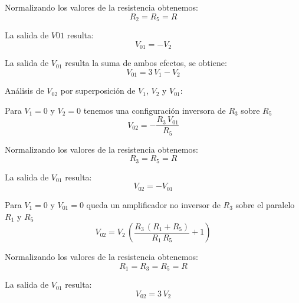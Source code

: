 \documentclass[12pt]{article}
\begin{document}
		Normalizando los valores de la resistencia obtenemos:
		\begin{equation}
			R_2=R_5=R 
		\end{equation}
		
		La salida de $V01$ resulta:
		\begin{equation}
			V_{01}=-V_2
		\end{equation}
		
		La salida de $V_{01}$ resulta la suma de ambos efectos, se obtiene:
		\begin{equation}
			V_{01}=3\,V_1-V_2
		\end{equation}
		
		Análisis de $V_{02}$ por superposición de $V_1$, $V_2$ y $V_{01}$:
		
		Para $V_1=0$ y $V_2=0$  tenemos una configuración inversora de $R_3$ sobre $R_5$
		\begin{equation}
			V_{02}=-\frac{R_3 \,V_{01} }{R_5 }
		\end{equation}
		
		Normalizando los valores de la resistencia obtenemos:
		\begin{equation}
			R_3=R_5=R 
		\end{equation}
		
		La salida de $V_{01}$ resulta:
		\begin{equation}
			V_{02}=-V_{01}
		\end{equation}
		
		Para $V_1=0$ y $V_{01}=0$ queda un amplificador no inversor de $R_3$ sobre el paralelo $R_1$ y $R_5$
		\begin{equation}
			V_{02} = V_2 \,{\left(\frac{R_3 \,{\left(R_1 +R_5 \right)}}{R_1 \,R_5 }+1\right)}
		\end{equation}
		
		Normalizando los valores de la resistencia obtenemos:
		\begin{equation}
			R_1=R_3=R_5=R 
		\end{equation}
		
		La salida de $V_{01}$ resulta:
		\begin{equation}
			V_{02}=3\,V_2
		\end{equation}
		
		
		
\end{document}
